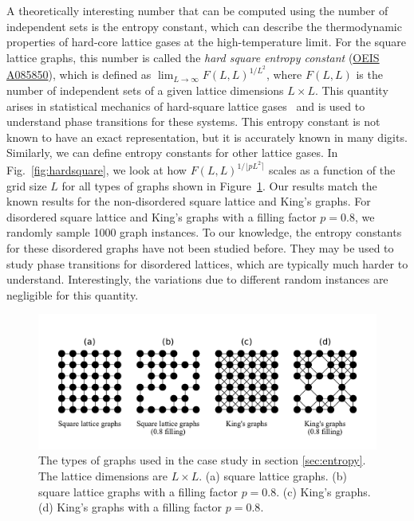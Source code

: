 \documentclass[onefignum, onetabnum]{siamart190516}
\newcommand{\<}{\langle}
\renewcommand{\>}{\rangle}
\newcommand{\Fig}[1]{Fig.~\ref{#1}}
\newcommand{\blue}[1]{[{\bf  \color{blue}{JG: #1}}]}
\newcounter{example}
\begin{document}
A theoretically interesting number that can be computed using the number of independent sets is the entropy constant, which can describe the thermodynamic properties of hard-core lattice gases at the high-temperature limit.
For the square lattice graphs, this number is called the \textit{hard square entropy constant} (\href{https://oeis.org/A085850}{OEIS A085850}), which is defined as $\lim_{L\rightarrow \infty} F(L,L)^{1/L^2}$, where $F(L,L)$ is the number of independent sets of a given lattice dimensions $L \times L$.
This quantity arises in statistical mechanics of hard-square lattice gases~\cite{Baxter1980, Pearce1988} and is used to understand phase transitions for these systems. This entropy constant is not known to have an exact representation, but it is accurately known in many digits. Similarly, we can define entropy constants for other lattice gases. In \Fig{fig:hardsquare}, we look at how $F(L,L)^{1/\lfloor pL^2\rceil}$ scales as a function of the grid size $L$ for all types of graphs shown in Figure~\ref{fig:lattices}. Our results match the known results for the non-disordered square lattice and King's graphs. For disordered square lattice and King's graphs with a filling factor $p=0.8$, we randomly sample 1000 graph instances. To our knowledge, the entropy constants for these disordered graphs have not been studied before. They may be used to study phase transitions for disordered lattices, which are typically much harder to understand. Interestingly, the variations due to different random instances are negligible for this quantity. 

\begin{figure}[t] 
    \centering
    \includegraphics[width=\textwidth, trim={0cm 1cm 0cm 1cm}, clip]{figures/lattices.pdf}
    \caption{The types of graphs used in the case study in section \ref{sec:entropy}.
    The lattice dimensions are $L\times L$. (a) square lattice graphs. (b) square lattice graphs with a filling factor $p=0.8$.
    (c) King's graphs. (d) King's graphs with a filling factor $p=0.8$.}
    \label{fig:lattices}
\end{figure}
\end{document}

